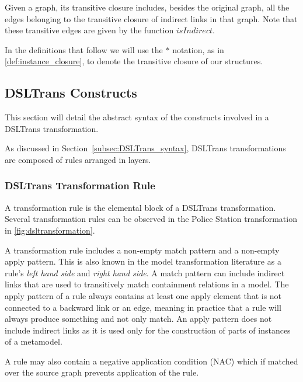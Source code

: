 Given a graph, its transitive closure includes, besides the original graph, all the edges belonging to the transitive closure of indirect links in that graph. Note that these transitive edges are given by the function $\mathit{isIndirect}$.


In the definitions that follow we will use the $*$ notation, as in \cref{def:instance_closure}, to denote the transitive closure of our structures.


\subsection{DSLTrans Constructs}
\label{sec:DSLTrans_formal}



This section will detail the abstract syntax of the constructs involved in a DSLTrans transformation.

As discussed in Section~\ref{subsec:DSLTrans_syntax}, DSLTrans transformations are composed of rules arranged in layers.


\subsubsection*{DSLTrans Transformation Rule}

A transformation rule is the elemental block of a DSLTrans transformation. Several transformation rules can be observed in the Police Station transformation in \cref{fig:dsltransformation}.

A transformation rule includes a non-empty match pattern and a non-empty apply pattern. This is also known in the model transformation literature as a rule's \emph{left hand side} and \emph{right hand side}. A match pattern can include indirect links that are used to transitively match containment relations in a model. The apply pattern of a rule always contains at least one apply element that is not connected to a backward link or an edge, meaning in practice that a rule will always produce something and not only match. An apply pattern does not include indirect links as it is used only for the construction of parts of instances of a metamodel.

A rule may also contain a negative application condition (NAC) which if matched over the source graph prevents application of the rule.

